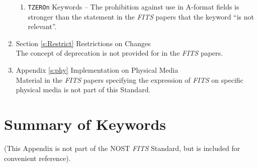 \begin{enumerate}
\begin {enumerate}
 \item {\tt TZEROn} Keywords -- The prohibition against use in 
     A-format fields is stronger than the statement 
     in the {\em FITS\/} papers that the
     keyword ``is not relevant''.

 \end{enumerate}

\item Section \ref{s:Restrict} Restrictions on Changes\\
     The concept of deprecation is not provided for in the 
     {\em FITS\/} papers.

\item Appendix \ref{s:phy} Implementation on Physical Media\\
     Material in the {\em FITS\/} papers specifying the 
     expression of {\em FITS\/} 
     on specific physical media is not part of this Standard.

\end{enumerate}

\chapter{Summary of Keywords}
   \label{s:summ} 
   (This Appendix is not part of the NOST {\em FITS\/} Standard, 
   but is included
   for convenient reference).
  
